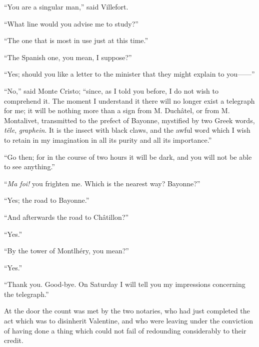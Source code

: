 “You are a singular man,” said Villefort.

“What line would you advise me to study?”

“The one that is most in use just at this time.”

“The Spanish one, you mean, I suppose?”

“Yes; should you like a letter to the minister that they might explain
to you——”

“No,” said Monte Cristo; “since, as I told you before, I do not wish to
comprehend it. The moment I understand it there will no longer exist a
telegraph for me; it will be nothing more than a sign from M. Duchâtel,
or from M. Montalivet, transmitted to the prefect of Bayonne, mystified
by two Greek words, \textit{têle}, \textit{graphein}. It is the insect with black
claws, and the awful word which I wish to retain in my imagination in
all its purity and all its importance.”

“Go then; for in the course of two hours it will be dark, and you will
not be able to see anything.”

“\textit{Ma foi!} you frighten me. Which is the nearest way? Bayonne?”

“Yes; the road to Bayonne.”

“And afterwards the road to Châtillon?”

“Yes.”

“By the tower of Montlhéry, you mean?”

“Yes.”

“Thank you. Good-bye. On Saturday I will tell you my impressions
concerning the telegraph.”

At the door the count was met by the two notaries, who had just
completed the act which was to disinherit Valentine, and who were
leaving under the conviction of having done a thing which could not
fail of redounding considerably to their credit.
